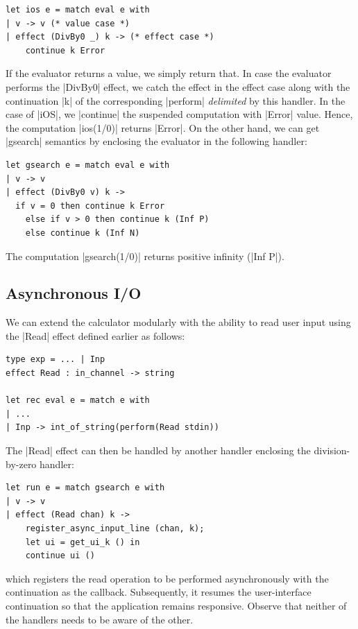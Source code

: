 \documentclass[sigplan,10pt,review,anonymous]{acmart}\settopmatter{printfolios=true,printccs=false,printacmref=false}
\begin{document}
\begin{lstlisting}
let ios e = match eval e with
| v -> v (* value case *)
| effect (DivBy0 _) k -> (* effect case *)
    continue k Error
\end{lstlisting}

If the evaluator returns a value, we simply return that. In case the evaluator
performs the |DivBy0| effect, we catch the effect in the effect case along with
the continuation |k| of the corresponding |perform| \emph{delimited} by this
handler. In the case of |iOS|, we |continue| the suspended computation with
|Error| value. Hence, the computation |ios(1/0)| returns |Error|. On the
other hand, we can get |gsearch| semantics by enclosing the evaluator in the
following handler:

\begin{lstlisting}
let gsearch e = match eval e with
| v -> v
| effect (DivBy0 v) k ->
  if v = 0 then continue k Error
	else if v > 0 then continue k (Inf P)
	else continue k (Inf N)
\end{lstlisting}

The computation |gsearch(1/0)| returns positive infinity (|Inf P|).

\subsection{Asynchronous I/O}
\label{sec:aio}

We can extend the calculator modularly with the ability to read user input
using the |Read| effect defined earlier as follows:

\begin{lstlisting}
type exp = ... | Inp
effect Read : in_channel -> string

let rec eval e = match e with
| ...
| Inp -> int_of_string(perform(Read stdin))
\end{lstlisting}

The |Read| effect can then be handled by another handler enclosing the
division-by-zero handler:

\begin{lstlisting}
let run e = match gsearch e with
| v -> v
| effect (Read chan) k ->
	register_async_input_line (chan, k);
	let ui = get_ui_k () in
	continue ui ()
\end{lstlisting}

\noindent which registers the read operation to be performed asynchronously
with the continuation as the callback. Subsequently, it resumes the
user-interface continuation so that the application remains responsive. Observe
that neither of the handlers needs to be aware of the other.
\end{document}
